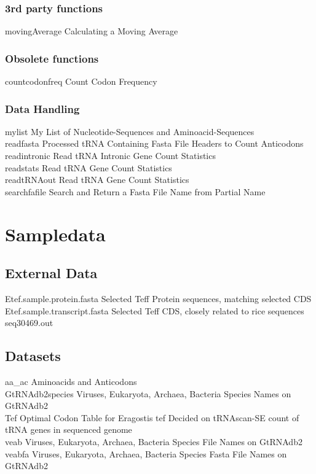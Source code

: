 \subsubsection{3rd party functions}
movingAverage	\quad Calculating a Moving Average \\

\subsubsection{Obsolete functions}
countcodonfreq	\quad Count Codon Frequency \\

\subsubsection{Data Handling}
mylist	\quad My List of Nucleotide-Sequences and Aminoacid-Sequences \\
readfasta	\quad Processed tRNA Containing Fasta File Headers to Count Anticodons \\
readintronic	\quad Read tRNA Intronic Gene Count Statistics \\
readstats	\quad Read tRNA Gene Count Statistics \\
readtRNAout	\quad Read tRNA Gene Count Statistics \\
searchfafile	\quad Search and Return a Fasta File Name from Partial Name \\

\section{Sampledata}

\subsection{External Data}
Etef.sample.protein.fasta \quad Selected Teff Protein sequences, matching selected CDS \\
Etef.sample.transcript.fasta \quad  Selected Teff CDS, closely related to rice sequences \\
seq30469.out \quad \\

\subsection{Datasets}
aa\_ac	\quad Aminoacids and Anticodons \\
GtRNAdb2species	\quad Viruses, Eukaryota, Archaea, Bacteria Species Names on GtRNAdb2 \\
Tef	\quad Optimal Codon Table for Eragostis tef Decided on tRNAscan-SE count of tRNA genes in sequenced genome \\
veab		\quad Viruses, Eukaryota, Archaea, Bacteria Species File Names on GtRNAdb2 \\
veabfa	\quad Viruses, Eukaryota, Archaea, Bacteria Species Fasta File Names on GtRNAdb2 \\




